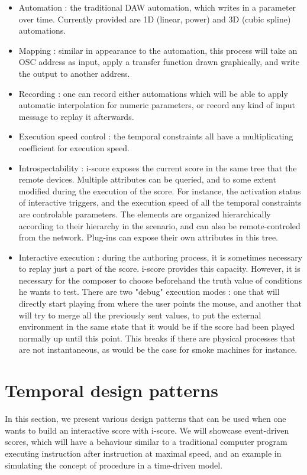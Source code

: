 \documentclass{article}
\begin{document}
\begin{itemize}
\item Automation : the traditional DAW automation, which writes in a parameter over time. 
Currently provided are 1D (linear, power) and 3D (cubic spline) automations.
\item Mapping : similar in appearance to the automation, this process will take an OSC address as input, apply a transfer function drawn graphically, and write the output to another address.
\item Recording : one can record either automations which will be able to apply automatic interpolation for numeric parameters, or record any kind of input message to replay it afterwards.
\item Execution speed control : the temporal constraints all have a multiplicating coefficient for execution speed.
\item Introspectability : i-score exposes the current score in the same tree that the remote devices. 
Multiple attributes can be queried, and to some extent modified during the execution of the score. 
For instance, the activation status of interactive triggers, and the execution speed of all the temporal constraints are controlable parameters.
The elements are organized hierarchically according to their hierarchy in the scenario, and can also be remote-controled from the network.
Plug-ins can expose their own attributes in this tree.
\item Interactive execution : during the authoring process, it is sometimes necessary to replay just a part of the score.
i-score provides this capacity. 
However, it is necessary for the composer to choose beforehand the truth value of conditions he wants to test.
There are two "debug" execution modes : one that will directly start playing from where the user points the mouse, and another that will try to merge all the previously sent values, to put the external environment in the same state that it would be if the score had been played normally up until this point. 
This breaks if there are physical processes that are not instantaneous, as would be the case for smoke machines for instance.
\end{itemize}
\section{Temporal design patterns}
In this section, we present various design patterns that can be used 
when one wants to build an interactive score with i-score.
We will showcase event-driven scores, which will have a behaviour 
similar to a traditional computer program executing instruction after 
instruction at maximal speed, and an example in simulating the 
concept of procedure in a time-driven model.
\end{document}
